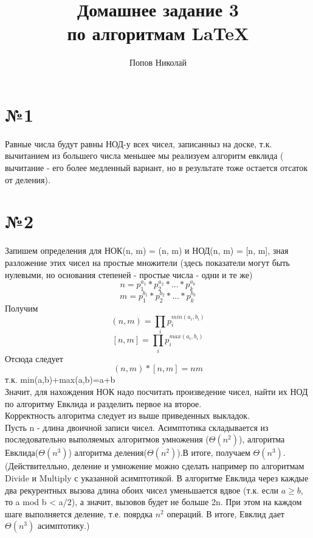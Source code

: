 \documentclass[a4paper,12pt]{article} %
\author{Попов Николай}
\title{Домашнее задание 3 \\ по алгоритмам \LaTeX{}}
\begin{document}

\maketitle 
\newpage 

\section*{№1}
Равные числа будут равны НОД-у всех чисел, записанныз на доске, т.к. вычитанием из большего числа меньшее мы реализуем алгоритм евклида ( вычитание - его более медленный вариант, но в результате тоже остается отсаток от деления).

\section*{№2}
Запишем определения для НОК(n, m) = (n, m) и НОД(n, m) = [n, m], зная разложение этих чисел на простые множители (здесь показатели могут быть нулевыми, но основания степеней - простые числа - одни и те же)
 \[n = p_{1}^{a_{1}}*p_{2}^{a_{2}}*...*p_{k}^{a_{k}}\]
\[m = p_{1}^{b_{1}}*p_{2}^{b_{2}}*...*p_{k}^{b_{k}}\]
Получим
\[(n, m)=
\prod\limits_{i}p_{i}^{min(a_{i},b_{i})}\]
\[[n, m]=
\prod\limits_{i}p_{i}^{max(a_{i},b_{i})}\]
Отсюда следует
\[(n, m)*[n, m]= nm\]
т.к. min(a,b)+max(a,b)=a+b\\

Значит, для нахождения НОК надо посчитать произведение чисел, найти их НОД по алгоритму Евклида и разделить первое на второе. \\

Корректность алгоритма следует из выше приведенных выкладок.\\

Пусть n - длина двоичной записи чисел.
Асимптотика складывается из последовательно выполяемых алгоритмов умножения ($\Theta(n^{2})$), алгоритма Евклида($\Theta(n^{3})$) алгоритма деления($\Theta(n^{2})$).В итоге, получаем $\Theta(n^{3})$. \\

(Действителльно, деление и умножение можно сделать например по алгоритмам Divide и Multiply с указанной асимптотикой. В алгоритме Евклида через каждые два рекурентных вызова длина обоих чисел уменьшается вдвое (т.к. если $a \geqslant b$, то a mod b < a/2), а значит, вызовов будет не больше 2n. При этом на каждом шаге выполняется деление, т.е. поярдка $n^{2}$ операций. В итоге, Евклид дает $\Theta(n^{3})$ асимптотику.)
\end{document}
